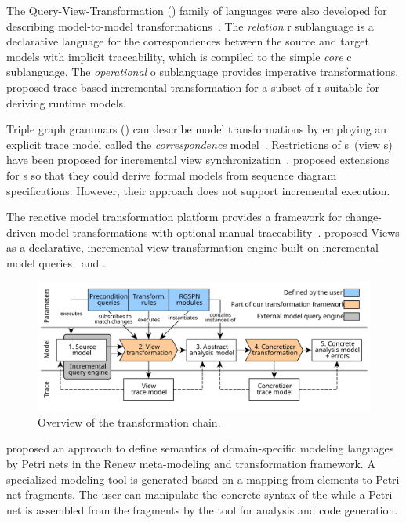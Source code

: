 The Query-View-Transformation () family of languages were also developed for describing model-to-model transformations~\citep{OMG16qvt}. The \emph{relation} r sublanguage is a declarative language for the correspondences between the source and target models with implicit traceability, which is compiled to the simple \emph{core} c sublanguage. The \emph{operational} o sublanguage provides imperative transformations. \citet{Song11incremental} proposed trace based incremental transformation for a subset of r suitable for deriving runtime models.

Triple graph grammars () can describe model transformations by employing an explicit trace model called the \emph{correspondence} model~\citep{Schurr94tgg}. Restrictions of s~(view s) have been proposed for incremental view synchronization~\citep{Jakob06nonmaterialized,Anjorin14materialized}. \citet{Greenyer11advanced} proposed extensions for s so that they could derive formal models from sequence diagram specifications. However, their approach does not support incremental execution.

The  reactive model transformation platform provides a framework for change-driven model transformations with optional manual traceability~\citep{Bergmann15viatra}. \citet{Debreceni14viewmodel} proposed  Views as a declarative, incremental view transformation engine built on incremental model queries~\citep{Ujhelyi15incquery} and .

\begin{figure}
  \centering
  \includegraphics[scale=0.9]{figures/transformation_chain}
  \caption{Overview of the transformation chain.}
  \label{fig:transform:overview}
\end{figure}

\citet{Mosteller16semantics} proposed an approach to define semantics of domain-specific modeling languages by Petri nets in the Renew meta-modeling and transformation framework. A specialized modeling tool is generated based on a mapping from  elements to Petri net fragments. The user can manipulate the concrete syntax of the  while a Petri net is assembled from the fragments by the tool for analysis and code generation.


